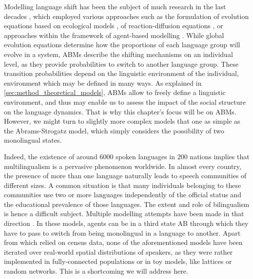 \documentclass[../thesis.tex]{subfiles}
\begin{document}
Modelling language shift has been the subject of much research in the last decades
\cite{CastellanoStatisticalPhysics2009,BoissonneaultSystematicInterdisciplinary2021},
which employed various approaches such as the formulation of evolution equations based
on ecological models
\cite{MiraInterlinguisticSimilarity2005,PinascoCoexistenceLanguages2006,KandlerEcologicalModels2008,SoleDiversityCompetition2010,HeinsaluRoleBilinguals2014},
of reaction-diffusion equations
\cite{KandlerDemographyLanguage2009,PatriarcaInfluenceGeography2009,IsernLanguageExtinction2014,ProchazkaQuantifyingDriving2017},
or approaches within the framework of agent-based modelling
\cite{CastelloOrderingDynamics2006,MinettModellingEndangered2008,CaridiSchellingvoterModel2013,ProchazkaQuantifyingDriving2017}.
While global evolution equations determine how the proportions of each language group
will evolve in a system, \acp{ABM} describe the shifting mechanisms on an individual
level, as they provide probabilities to switch to another language group. These
transition probabilities depend on the linguistic environment of the individual,
environment which may be defined in many ways.
As explained in \cref{sec:method_theoretical_models}, \acp{ABM} allow to freely define a
linguistic environment, and thus may enable us to assess the impact of the social
structure on the language dynamics. That is why this chapter's focus will be on
\acp{ABM}. However, we might turn to slightly more complex models that one as simple as
the Abrams-Strogatz model, which simply considers the possibility of two monolingual
states.

Indeed, the existence of around \SI{6000}{} spoken languages in 200 nations implies that
multilingualism is a pervasive phenomenon worldwide. In almost every country, the
presence of more than one language naturally leads to speech communities of different
sizes. A common situation is that many individuals belonging to these communities use
two or more languages independently of the official status and the educational
prevalence of those languages. The extent and role of bilingualism is hence a difficult
subject. Multiple modelling attempts have been made in that direction
\cite{CastelloOrderingDynamics2006,PatriarcaInfluenceGeography2009,PatriarcaModelingTwolanguage2012,VazquezAgentBased2010}.
In these models, agents can be in a third state AB through which they have to pass to
switch from being monolingual in a language to another. Apart from
\cite{ProchazkaQuantifyingDriving2017} which relied on census data, none of the
aforementioned models have been iterated over real-world spatial distributions of
speakers, as they were rather implemented in fully-connected populations or in toy
models, like lattices or random networks. This is a shortcoming we will address here.
\end{document}
